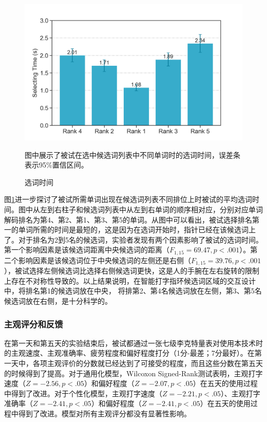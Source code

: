 \begin{figure}[!htbp]
	\centering
	\includegraphics[width=0.8\linewidth]{figures/QwertyRing_selecting_time.png}
	\caption*{图中展示了被试在选中候选词列表中不同单词时的选词时间，误差条表示95\%置信区间。}
	\caption{选词时间}
	\label{fig:QwertyRing_selecting_time}
\end{figure}

图\ref{fig:QwertyRing_selecting_time}进一步探讨了被试所需单词出现在候选词列表不同排位上时被试的平均选词时间。图中从左到右柱子和候选词列表中从左到右单词的顺序相对应，分别对应单词解码排名为第4、第2、第1、第3、第5的单词。从图中可以看出，被试选择排名第一的单词所需的时间是最短的，这是因为在选词开始时，指针已经在该候选词上了。对于排名为2到5名的候选词，实验者发现有两个因素影响了被试的选词时间。第一个影响因素是该候选词距离中央候选词的距离（$F_{1,15}=69.47,p<.001$）。第二个影响因素是该候选词位于中央候选词的左侧还是右侧（$F_{1,15}=39.76,p<.001$），被试选择左侧候选词比选择右侧候选词更快，这是人的手腕在左右旋转的限制上存在不对称性导致的\cite{grandjean1997fitting}。以上结果说明，在智能打字指环候选词区域的交互设计中，将排名第1的候选词放在中央， 将排第2、第4名候选词放在左侧，第3、第5名候选词放在右侧，是十分科学的。

\subsubsection{主观评分和反馈}

在第一天和第五天的实验结束后，被试都通过一张七级李克特量表对使用本技术时的主观速度、主观准确率、疲劳程度和偏好程度打分（1分-最差；7分最好）。在第一天中，各项主观评价的分数就已经达到了可接受的程度，而且这些分数在第五天的时候得到了提高。对于通用化模型，Wilcoxon Signed-Rank测试表明，主观打字速度（$Z=-2.56, p<.05$）和偏好程度（$Z=-2.07, p<.05$）在五天的使用过程中得到了改进。对于个性化模型，主观打字速度（$Z=-2.21, p<.05$）、主观打字准确率（$Z=-2.41, p<.05$）和偏好程度（$Z=-2.41, p<.05$）在五天的使用过程中得到了改进。模型对所有主观评分都没有显著性影响。

